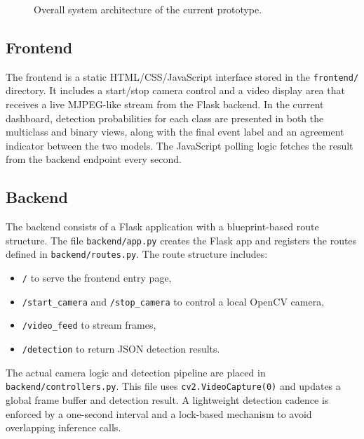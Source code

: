 \documentclass[11pt,a4paper]{article}
\begin{document}
\begin{figure}[h]
\centering
{}
\caption{Overall system architecture of the current prototype.}
\label{fig:overall-architecture}
\end{figure}

\subsection{Frontend}
The frontend is a static HTML/CSS/JavaScript interface stored in the \texttt{frontend/} directory. It includes a start/stop camera control and a video display area that receives a live MJPEG-like stream from the Flask backend. In the current dashboard, detection probabilities for each class are presented in both the multiclass and binary views, along with the final event label and an agreement indicator between the two models. The JavaScript polling logic fetches the result from the backend endpoint every second.

\subsection{Backend}
The backend consists of a Flask application with a blueprint-based route structure. The file \texttt{backend/app.py} creates the Flask app and registers the routes defined in \texttt{backend/routes.py}. The route structure includes:
\begin{itemize}[leftmargin=1.5em]
    \item \texttt{/} to serve the frontend entry page,
    \item \texttt{/start\_camera} and \texttt{/stop\_camera} to control a local OpenCV camera,
    \item \texttt{/video\_feed} to stream frames,
    \item \texttt{/detection} to return JSON detection results.
\end{itemize}
The actual camera logic and detection pipeline are placed in \texttt{backend/controllers.py}. This file uses \texttt{cv2.VideoCapture(0)} and updates a global frame buffer and detection result. A lightweight detection cadence is enforced by a one-second interval and a lock-based mechanism to avoid overlapping inference calls.
\end{document}
